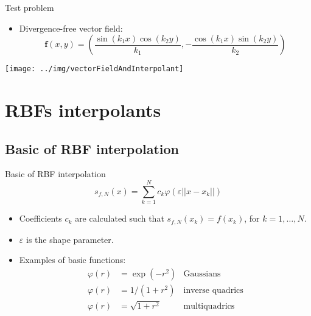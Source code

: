 \documentclass{beamer}
\begin{document}
\begin{frame}{Test problem}
  \begin{itemize}  
    \item Divergence-free vector field:
      \begin{equation*}
	\mathbf{f}(x,y) = \left( \frac{\sin(k_1 x)\cos(k_2 y)}{k_1}, 
	-\frac{\cos(k_1 x)\sin(k_2 y)}{k_2}\right)
      \end{equation*}
  \end{itemize}

  \begin{center}
    \texttt{[image: ../img/vectorFieldAndInterpolant]}
  \end{center}
\end{frame}

\section{RBFs interpolants}
\subsection{Basic of RBF interpolation}
\begin{frame}{Basic of RBF interpolation}
  \begin{equation*}
    s_{f,N}(x) = \sum_{k=1}^{N} c_{k}\varphi(\varepsilon ||x - x_{k}||)
  \end{equation*}

  \begin{itemize}
    \item Coefficients $c_k$ are calculated such that $s_{f,N}(x_k) = f(x_k)$,
      for $k = 1,\ldots,N$.

    \item $\varepsilon$ is the shape parameter.

    \item Examples of basic functions:
      \begin{align*}
        \varphi(r) &= \exp(-r^{2}) &\text{Gaussians} \\
        \varphi(r) &= 1/(1 + r^{2}) &\text{inverse quadrics} \\
        \varphi(r) &= \sqrt{1 + r^{2}} &\text{multiquadrics}
      \end{align*}
  \end{itemize}
\end{frame}
\end{document}
